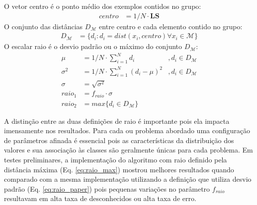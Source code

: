 \begin{definition}
  O vetor centro é o ponto médio dos exemplos contidos no grupo:
  \begin{align}
    centro    &= 1/N \cdot \mathbf{LS} \label{eq:centro}
  \end{align}
  O conjunto das distâncias $D_\mathcal{M}$ entre centro e cada elemento contido no grupo:
  \begin{align}
    D_\mathcal{M}  &= \{ d_i : d_i = dist(x_i, centro) \forall x_i \in \mathcal{M} \} \nonumber
  \end{align}
  O escalar raio é o desvio padrão ou o máximo do conjunto $D_\mathcal{M}$:
  \begin{align}
    \mu       &= 1/N \cdot \sum_{i=1}^{N} d_i             &, d_i \in D_\mathcal{M} \nonumber \\
    \sigma^2  &= 1/N \cdot \sum_{i=1}^{N} (d_i - \mu) ^2  &, d_i \in D_\mathcal{M} \nonumber \\
    \sigma    &= \sqrt{ \sigma^2 }                        & \nonumber \\
    raio_1    &= f_{raio} \cdot \sigma                    & \label{eq:raio_paper}\\
    raio_2    &= max\{ d_i \in D_\mathcal{M} \}           & \label{eq:raio_max}
  \end{align}
\end{definition}


A distinção entre as duas definições de raio é importante pois ela impacta
imensamente nos resultados.
Para cada \dataset ou problema abordado uma configuração de parâmetros afinada
é essencial pois as características da distribuição dos valores e sua associação
às classes são geralmente únicas para cada problema.
Em testes preliminares, a implementação do algoritmo \minas com raio definido
pela distância máxima (Eq. \ref{eq:raio_max}) mostrou melhores resultados quando
comparado com a mesma implementação utilizando a definição que utiliza desvio
padrão (Eq. \ref{eq:raio_paper}) pois pequenas variações no parâmetro $f_{raio}$
resultavam em alta taxa de desconhecidos ou alta taxa de erro.


